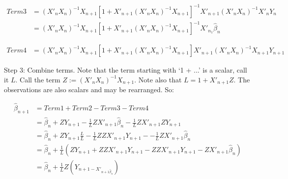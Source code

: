 \documentclass[14pt]{extreport}
\begin{document}
\begin{enumerate}
    \begin{align*}
        Term3 &= (X'_n X_n)^{-1} X_{n+1} \left[1 + X'_{n+1}(X'_n X_n)^{-1}X_{n+1}\right]^{-1}
                 X'_{n+1}(X'_nX_n)^{-1}X'_nY_n \\
              &= (X'_n X_n)^{-1}X_{n+1}\left[1 + X'_{n+1}(X'_n X_n)^{-1}X_{n+1}\right]^{-1}
                 X'_{n_1} \widehat{\beta}_n
    \end{align*}

    \begin{align*}
        Term4 &= (X'_n X_n)^{-1} X_{n+1} \left[1 + X'_{n+1}(X'_n X_n)^{-1}X_{n+1}\right]
                X'_{n+1}(X'_n X_n)^{-1} X_{n+1} Y_{n+1}
    \end{align*}

    Step 3: Combine terms. Note that the term starting with `1 + ...' is a scalar, call it \(L\). 
    Call the term \(Z := (X'_n X_n)^{-1} X_{n+1}\). Note also that \(L = 1 + X'_{n+1}Z\). The observations
    are also scalars and may be rearranged. So:

    \begin{align*}
        \widehat{\beta}_{n+1} &= Term1 + Term2 - Term3 - Term4 \\
        &= \widehat{\beta}_n + Z Y_{n+1} - \frac{1}{L} Z X'_{n+1}\widehat{\beta}_n - 
        \frac{1}{L} Z X'_{n+1} Z Y_{n+1} \\
        &= \widehat{\beta}_n + ZY_{n+1}\frac{L}{L} - \frac{1}{L} ZZ X'_{n+1} Y_{n+1} - 
        - \frac{1}{L} Z X'_{n+1}\widehat{\beta}_n \\
        &= \widehat{\beta}_n + \frac{1}{L}(ZY_{n+1} + ZZ X'_{n+1} Y_{n+1} - ZZ X'_{n+1} Y_{n+1}
        - Z X'_{n+1}\widehat{\beta}_n) \\
        &= \widehat{\beta}_n + \frac{1}{L}Z(Y_{n+1 - X'_{n+1\widehat{\beta}_n}})
    \end{align*}
    
\end{enumerate}
\end{document}
